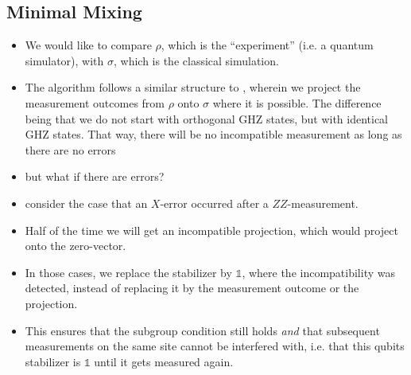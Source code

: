 \subsection{Minimal Mixing}\label{sec:minimal-mixing}
\begin{itemize}
  \item We would like to compare $\rho$, which is the \enquote{experiment}
    (i.e. a quantum simulator), with $\sigma$, which is the classical
    simulation.
  \item The algorithm follows a similar structure to
    \cite{liCrossEntropyBenchmark2023}, wherein we project the measurement
    outcomes from $\rho$ onto $\sigma$ where it is possible. The difference
    being that we do not start with orthogonal GHZ states, but with identical
    GHZ states. That way, there will be no incompatible measurement as long as
    there are no errors
  \item but what if there are errors?
  \item consider the case that an $X$-error occurred after a $ZZ$-measurement.
  \item Half of the time we will get an incompatible projection, which would
    project onto the zero-vector.
  \item In those cases, we replace the stabilizer by $\mathds{1}$, where the
    incompatibility was detected, instead of replacing it by the measurement
    outcome or the projection.
  \item This ensures that the subgroup condition still holds \emph{and} that
    subsequent measurements on the same site cannot be interfered with, i.e.
    that this qubits stabilizer is $\mathds{1}$ until it gets measured again.
\end{itemize}

